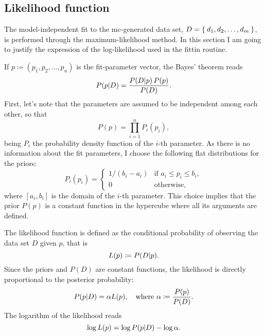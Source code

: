 \subsection{Likelihood function}

    The model-independent fit to the \ac{mc}-generated data set, $D = \Set{d_1, d_2,\dots, d_m}$, is performed through the maximum-likelihood method.
    In this section I am going to justify the expression of the log-likelihood used in the fittin routine.

    If $p \coloneqq (p_1, p_2,\dots, p_n)$ is the fit-parameter vector, the Bayes' theorem reads
    \begin{equation}
        P(p\vert D) = \frac{P(D\vert p)\, P(p)}{P(D)}.
    \end{equation}
    First, let's note that the parameters are assumed to be independent among each other, so that
    \begin{equation}
        P(p) = \prod_{i = 1}^n P_i(p_i),
    \end{equation}
    being $P_i$ the probability density function of the $i$-th parameter.
    As there is no information about the fit parameters, I choose the following flat distributions for the priors:
    \begin{equation}\label{eq:flat_priors}
        P_i(p_i) =
        \begin{cases}
            1/(b_i - a_i) & \text{if } a_i \le p_i \le b_i, \\
            0             & \text{otherwise},
        \end{cases}
    \end{equation}
    where $[a_i, b_i]$ is the domain of the $i$-th parameter.
    This choice implies that the prior $P(p)$ is a constant function in the hypercube where all its arguments are defined.

    The likelihood function is defined as the conditional probability of observing the data set $D$ given $p$, that is
    \begin{equation}
        L(p) \coloneqq P(D\vert p).
    \end{equation}
    Since the priors and $P(D)$ are constant functions, the likelihood is directly proportional to the posterior probability:
    \begin{equation}
        P(p\vert D) = \alpha L(p),\quad \text{where } \alpha \coloneqq \frac{P(p)}{P(D)}.
    \end{equation}
    The logarithm of the likelihood reads
    \begin{equation}
        \log L(p) = \log P(p\vert D) - \log \alpha.
    \end{equation}


